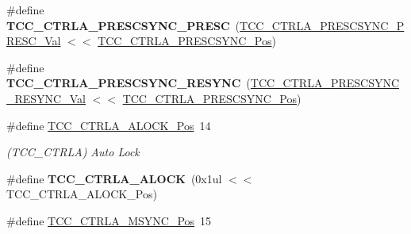 \begin{DoxyCompactItemize}
\item 
\hypertarget{group___s_a_m_l21___t_c_c_ga7117929531bcfc2bf7e049da3e8f1ab9}{}\#define {\bfseries T\+C\+C\+\_\+\+C\+T\+R\+L\+A\+\_\+\+P\+R\+E\+S\+C\+S\+Y\+N\+C\+\_\+\+P\+R\+E\+S\+C}~(\hyperlink{group___s_a_m_l21___t_c_c_ga733366d296f397ce26bc35ec3edf37e7}{T\+C\+C\+\_\+\+C\+T\+R\+L\+A\+\_\+\+P\+R\+E\+S\+C\+S\+Y\+N\+C\+\_\+\+P\+R\+E\+S\+C\+\_\+\+Val} $<$$<$ \hyperlink{group___s_a_m_l21___t_c_c_ga779b0a47e8b363609fc5d3f20c62288a}{T\+C\+C\+\_\+\+C\+T\+R\+L\+A\+\_\+\+P\+R\+E\+S\+C\+S\+Y\+N\+C\+\_\+\+Pos})\label{group___s_a_m_l21___t_c_c_ga7117929531bcfc2bf7e049da3e8f1ab9}

\item 
\hypertarget{group___s_a_m_l21___t_c_c_gab8b95ec2953fbd119a5b6cc6430f5cf0}{}\#define {\bfseries T\+C\+C\+\_\+\+C\+T\+R\+L\+A\+\_\+\+P\+R\+E\+S\+C\+S\+Y\+N\+C\+\_\+\+R\+E\+S\+Y\+N\+C}~(\hyperlink{group___s_a_m_l21___t_c_c_ga25f6ad5567ba0810a52522cc4e0a275d}{T\+C\+C\+\_\+\+C\+T\+R\+L\+A\+\_\+\+P\+R\+E\+S\+C\+S\+Y\+N\+C\+\_\+\+R\+E\+S\+Y\+N\+C\+\_\+\+Val} $<$$<$ \hyperlink{group___s_a_m_l21___t_c_c_ga779b0a47e8b363609fc5d3f20c62288a}{T\+C\+C\+\_\+\+C\+T\+R\+L\+A\+\_\+\+P\+R\+E\+S\+C\+S\+Y\+N\+C\+\_\+\+Pos})\label{group___s_a_m_l21___t_c_c_gab8b95ec2953fbd119a5b6cc6430f5cf0}

\item 
\hypertarget{group___s_a_m_l21___t_c_c_gab5fadaa5046a69b0eb06691268306bf4}{}\#define \hyperlink{group___s_a_m_l21___t_c_c_gab5fadaa5046a69b0eb06691268306bf4}{T\+C\+C\+\_\+\+C\+T\+R\+L\+A\+\_\+\+A\+L\+O\+C\+K\+\_\+\+Pos}~14\label{group___s_a_m_l21___t_c_c_gab5fadaa5046a69b0eb06691268306bf4}

\begin{DoxyCompactList}\small\item\em (T\+C\+C\+\_\+\+C\+T\+R\+L\+A) Auto Lock \end{DoxyCompactList}\item 
\hypertarget{group___s_a_m_l21___t_c_c_ga4c0c19b1b6d0b39567810f5360dd6e7e}{}\#define {\bfseries T\+C\+C\+\_\+\+C\+T\+R\+L\+A\+\_\+\+A\+L\+O\+C\+K}~(0x1ul $<$$<$ T\+C\+C\+\_\+\+C\+T\+R\+L\+A\+\_\+\+A\+L\+O\+C\+K\+\_\+\+Pos)\label{group___s_a_m_l21___t_c_c_ga4c0c19b1b6d0b39567810f5360dd6e7e}

\item 
\hypertarget{group___s_a_m_l21___t_c_c_ga7c55e5724a89afa08e9391e962a61156}{}\#define \hyperlink{group___s_a_m_l21___t_c_c_ga7c55e5724a89afa08e9391e962a61156}{T\+C\+C\+\_\+\+C\+T\+R\+L\+A\+\_\+\+M\+S\+Y\+N\+C\+\_\+\+Pos}~15\label{group___s_a_m_l21___t_c_c_ga7c55e5724a89afa08e9391e962a61156}


\end{DoxyCompactItemize}
